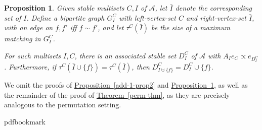 \documentclass[11pt]{article}
\newcommand{\expref}[2]{\texorpdfstring{\hyperref[#2]{#1~\ref{#2}}}{#1~\ref{#2}}}
\newtheorem{proposition}[theorem]{Proposition}
\begin{document}
\begin{proposition}
\label{add-active-prop22}
Given stable multisets $C, I$ of $\mathcal A$, let $\bar I$ denote the corresponding set of $I$. Define a bipartite graph $G^C_{I}$ with left-vertex-set $C$ and right-vertex-set  $\bar I$, with an edge on $f, f'$ iff $f \sim f'$, and let $\tau^{C}(\bar I)$ be the size of a maximum matching in $G^C_{I}$.   

For such multisets $I, C$, there is an associated stable set $D^C_{I}$ of $\mathcal A$ with $A_I e_C \propto e_{D^C_{I}}$. Furthermore, if $\tau^C(\bar I \cup \{f \}) = \tau^C(\bar I)$, then $D^C_{I \uplus \{f \}} = D^C_{I} \cup \{ f \}$.
\end{proposition}

We omit the proofs of \expref{Proposition}{add-1-prop2} and \expref{Proposition}{add-active-prop22}, as well as the remainder of the proof of \expref{Theorem}{perm-thm}, as they are precisely analogous to the permutation setting. 

\newcommand{\prelim}{Preliminary version in\ }\newcommand{\prelims}{Preliminary
  versions in\ }
\providecommand{\bibhead}[1]{}
\expandafter\ifx\csname pdfbookmark\endcsname\relax%
  \providecommand{\tocrefpdfbookmark}{}
\else\providecommand{\tocrefpdfbookmark}{%
   \hypertarget{tocreferences}{}%
   \pdfbookmark[1]{References}{tocreferences}}%
\fi
\end{document}
